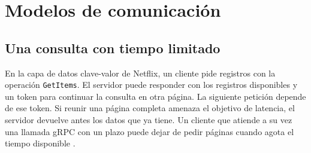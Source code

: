 \section{Modelos de comunicación}
\subsection{Una consulta con tiempo limitado}
En la capa de datos clave-valor de Netflix, un cliente pide registros con la operación \texttt{GetItems}. El servidor puede responder con los registros disponibles y un token para continuar la consulta en otra página. La siguiente petición depende de ese token. Si reunir una página completa amenaza el objetivo de latencia, el servidor devuelve antes los datos que ya tiene. Un cliente que atiende a su vez una llamada gRPC con un plazo puede dejar de pedir páginas cuando agota el tiempo disponible \cite{leonel-kv,fallos-grpc}.

